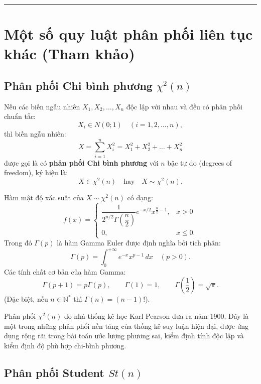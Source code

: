 \vspace{1.5em}
\hrule
\vspace{1.5em}

\section{Một số quy luật phân phối liên tục khác (Tham khảo)}

\subsection{Phân phối Chi bình phương \texorpdfstring{$\chi^2(n)$}{Chi-binh-phuong}}

\begin{dinhnghia}
Nếu các biến ngẫu nhiên $X_1, X_2, \dots, X_n$ độc lập với nhau và đều có phân phối chuẩn tắc:
\[
X_i \in N(0; 1) \quad (i = 1, 2, \dots, n),
\]
thì biến ngẫu nhiên:
\[
X = \sum_{i=1}^n X_i^2 = X_1^2 + X_2^2 + \dots + X_n^2
\]
được gọi là có \textbf{phân phối Chi bình phương} với $n$ bậc tự do (degrees of freedom), ký hiệu là:
\[
X \in \chi^2(n) \quad \text{hay} \quad X \sim \chi^2(n).
\]

Hàm mật độ xác suất của $X \sim \chi^2(n)$ có dạng:
\[
f(x) = \begin{cases}
\dfrac{1}{2^{n/2} \Gamma\left(\dfrac{n}{2}\right)} e^{-x/2} x^{\frac{n}{2} - 1}, & x > 0 \\
0, & x \le 0.
\end{cases}
\]
Trong đó $\Gamma(p)$ là hàm Gamma Euler được định nghĩa bởi tích phân:
\[
\Gamma(p) = \int_0^{+\infty} e^{-x} x^{p - 1}\,dx \quad (p > 0).
\]
Các tính chất cơ bản của hàm Gamma:
\[
\Gamma(p + 1) = p \Gamma(p), \qquad \Gamma(1) = 1, \qquad \Gamma\left(\frac{1}{2}\right) = \sqrt{\pi}.
\]
(Đặc biệt, nếu $n \in \mathbb{N}^*$ thì $\Gamma(n) = (n - 1)!$).
\end{dinhnghia}

\begin{nhanxet}
Phân phối $\chi^2(n)$ do nhà thống kê học Karl Pearson đưa ra năm 1900. Đây là một trong những phân phối nền tảng của thống kê suy luận hiện đại, được ứng dụng rộng rãi trong bài toán ước lượng phương sai, kiểm định tính độc lập và kiểm định độ phù hợp chi-bình phương.
\end{nhanxet}

\subsection{Phân phối Student \texorpdfstring{$St(n)$}{Student}}

